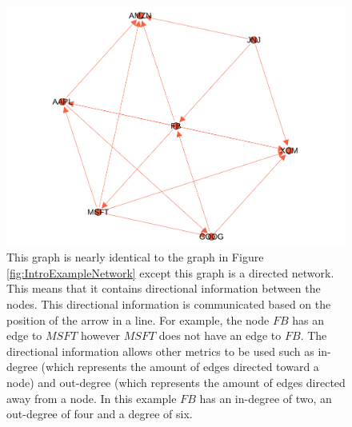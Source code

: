 
\begin{figure}[!htb]
    \centering
     \includegraphics[width=\textwidth]{figures/Intro/ExampleNetworkDirected.pdf}
    \caption{
This graph is nearly identical to the graph in Figure \ref{fig:IntroExampleNetwork} except this graph is a directed network. This means that it contains directional information between the nodes. This directional information is communicated based on the position of the arrow in a line. For example, the node \(FB\) has an edge to \(MSFT\) however \(MSFT\) does not have an edge to \(FB\). The directional information allows other metrics to be used such as in-degree (which represents the amount of edges directed toward a node) and out-degree (which represents the amount of edges directed away from a node. In this example \(FB\) has an in-degree of two, an out-degree of four and a degree of six.
      }
	\label{fig:ExampleNetworkDirected}
\end{figure}




